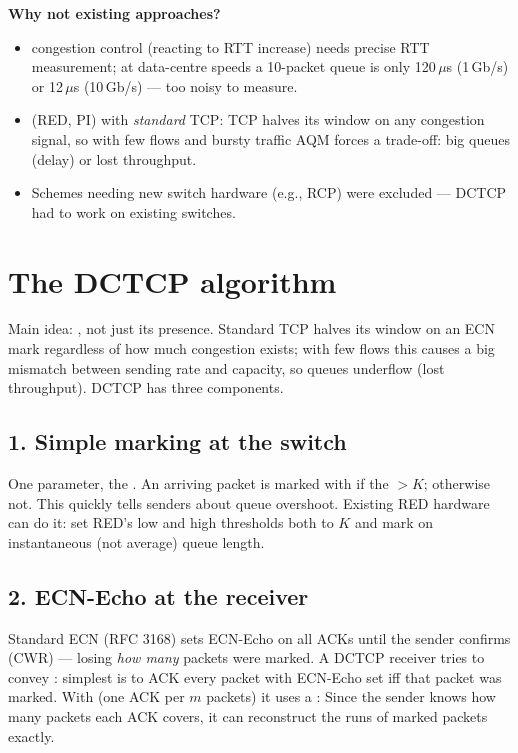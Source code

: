 \textbf{Why not existing approaches?}
\begin{itemize}
\item {} congestion control (reacting to RTT increase) needs precise RTT measurement; at data-centre speeds a 10-packet queue is only 120\,$\mu$s (1\,Gb/s) or 12\,$\mu$s (10\,Gb/s) --- too noisy to measure.
\item {} (RED, PI) with \emph{standard} TCP: TCP halves its window on any congestion signal, so with few flows and bursty traffic AQM forces a trade-off: big queues (delay) or lost throughput.
\item Schemes needing new switch hardware (e.g., RCP) were excluded --- DCTCP had to work on existing switches.
\end{itemize}

\section{The DCTCP algorithm}
Main idea: , not just its presence. Standard TCP halves its window on an ECN mark regardless of how much congestion exists; with few flows this causes a big mismatch between sending rate and capacity, so queues underflow (lost throughput). DCTCP has three components.

\subsection{1. Simple marking at the switch}
One parameter, the . An arriving packet is marked with  if the  $> K$; otherwise not. This quickly tells senders about queue overshoot. Existing RED hardware can do it: set RED's low and high thresholds both to $K$ and mark on instantaneous (not average) queue length.

\subsection{2. ECN-Echo at the receiver}
Standard ECN (RFC 3168) sets ECN-Echo on all ACKs until the sender confirms (CWR) --- losing \emph{how many} packets were marked. A DCTCP receiver tries to convey : simplest is to ACK every packet with ECN-Echo set iff that packet was marked. With  (one ACK per $m$ packets) it uses a :
Since the sender knows how many packets each ACK covers, it can reconstruct the runs of marked packets exactly.

